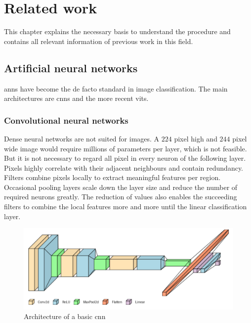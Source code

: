 \chapter{Related work}
This chapter explains the necessary basis to understand the procedure and contains all relevant information of previous work in this field.

\section{Artificial neural networks}


\glspl{ann} have become the de facto standard in image classification.%
The main architectures are \glspl{cnn} and the more recent \glspl{vit}.

\subsection{Convolutional neural networks}
Dense neural networks are not suited for images. A $224$ pixel high and $244$ pixel wide image would require millions of parameters per layer, which is not feasible. But it is not necessary to regard all pixel in every neuron of the following layer. 
Pixels highly correlate with their adjacent neighbours and contain redundancy. 
Filters combine pixels locally to extract meaningful features per region. Occasional pooling layers scale down the layer size and reduce the number of required neurons greatly. The reduction of values also enables the succeeding filters to combine the local features more and more until the linear classification layer.


\begin{figure}[H]
    \begin{center}
    \includegraphics[width=15cm]{../images/cnn_architecture.png}
    \caption{Architecture of a basic \gls{cnn}}\label{fig:cnn_architecture}
    \end{center}
\end{figure}

